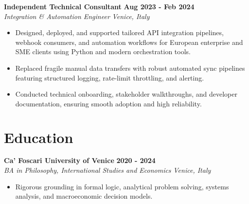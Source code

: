 \documentclass[10pt,a4paper]{article}
\newcommand{\role}[4]{%
  \textbf{#1} \hfill \textbf{#2}\\[1pt]%
  \textit{#3} \hfill \textit{#4}\\[2pt]%
}
\begin{document}
\role{Independent Technical Consultant}{Aug 2023 - Feb 2024}{Integration \& Automation Engineer}{Venice, Italy}
\begin{itemize}
  \item Designed, deployed, and supported tailored API integration pipelines, webhook consumers, and automation workflows for European enterprise and SME clients using Python and modern orchestration tools.
  \item Replaced fragile manual data transfers with robust automated sync pipelines featuring structured logging, rate-limit throttling, and alerting.
  \item Conducted technical onboarding, stakeholder walkthroughs, and developer documentation, ensuring smooth adoption and high reliability.
\end{itemize}

\section{Education}
\role{Ca' Foscari University of Venice}{2020 - 2024}{BA in Philosophy, International Studies and Economics}{Venice, Italy}
\begin{itemize}
  \item Rigorous grounding in formal logic, analytical problem solving, systems analysis, and macroeconomic decision models.
\end{itemize}
\end{document}
